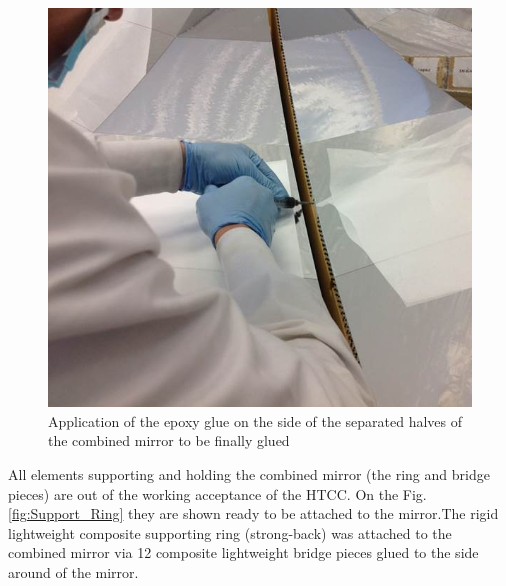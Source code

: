    \begin{figure}[ht]
    \centering
    \includegraphics[width=1.0\linewidth]{images/Final_Gluing.jpg}
    \caption{Application of the epoxy glue on the side of the separated halves of the combined mirror to be finally glued}
    \label{fig:Final_Gluing}
\end{figure}
  
  All elements supporting and holding the combined mirror (the ring and bridge pieces) are out of the working acceptance of the HTCC. On the Fig.\ref{fig:Support_Ring} they are shown ready to be attached to the mirror.The rigid lightweight composite supporting ring (strong-back) was attached to the combined mirror via 12 composite lightweight bridge pieces glued to the side around of the mirror. 
  
